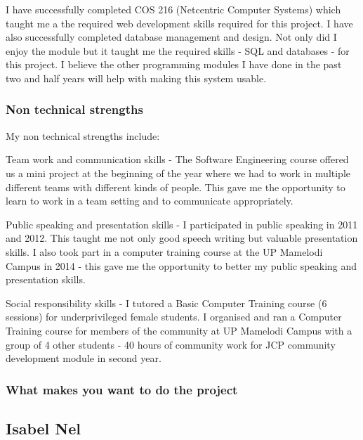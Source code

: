 \documentclass[hidelinks, 12pt, oneside]{article}
\begin{document}
I have successfully completed COS 216 (Netcentric Computer Systems)  which taught me a the required web development skills required for this project. 
I have also successfully completed database management and design. Not only did I enjoy the module but it taught me the required skills - SQL and databases - for this project. 
I believe the other programming modules I have done in the past two and half years will help with making this system usable.

\subsubsection{Non technical strengths}

My non technical strengths include: 

Team work and communication skills - The Software Engineering course offered us a mini project at the beginning of the year where we had to work in multiple different teams with different kinds of people. This gave me the opportunity to learn to work in a team setting and to communicate appropriately.
 
Public speaking and presentation skills - I participated in public speaking in 2011 and 2012. This taught me not only good speech writing but valuable presentation skills.
I also took part in a computer training course at the UP Mamelodi Campus in 2014 - this gave me the opportunity to better my public speaking and presentation skills.

Social responsibility skills - I tutored a Basic Computer Training course (6 sessions) for underprivileged female students.
I organised and ran a Computer Training course for members of the community at UP Mamelodi Campus with a group of 4 other students - 40 hours of community work for JCP community development module in second year.

\subsubsection{What makes you want to do the project}

\subsection{Isabel Nel}
\end{document}
